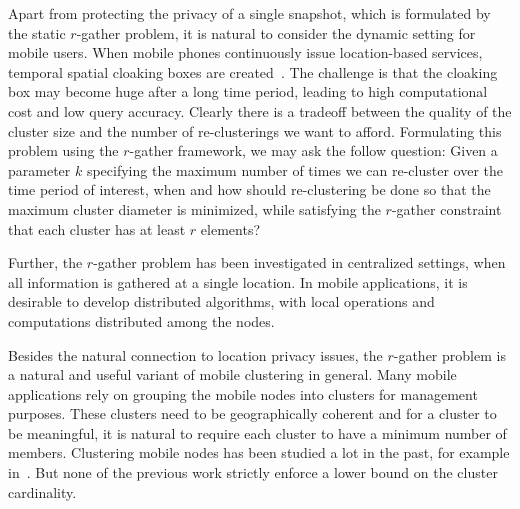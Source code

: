 Apart from protecting the privacy of a single snapshot, which is formulated by the static $r$-gather problem, it is natural to consider the dynamic setting for mobile users. 
When mobile phones continuously issue location-based services, temporal spatial cloaking boxes are created~\cite{Chow:2007:EPC:1784462.1784477,Xu:2007:LAC:1341012.1341062,4509698}. The challenge is that the cloaking box may become huge after a long time period, leading to high computational cost and low query accuracy. Clearly there is a tradeoff between the quality of the cluster size and the number of re-clusterings we want to afford. Formulating this problem using the $r$-gather framework, we may ask the follow question: Given a parameter $k$ specifying the maximum number of times we can re-cluster over the time period of interest, when and how should re-clustering be done so that the maximum cluster diameter is minimized, while satisfying the $r$-gather constraint that each cluster has at least $r$ elements?

Further, the $r$-gather problem has been investigated in centralized settings, when all information is gathered at a single location. In mobile applications, it is desirable to  develop distributed algorithms, with local operations and computations distributed among the nodes. 

Besides the natural connection to location privacy issues, the $r$-gather problem is a natural and useful variant of mobile clustering in general. Many mobile applications rely on grouping the mobile nodes into clusters for management purposes. These clusters need to be geographically coherent and for a cluster to be meaningful, it is natural to require each cluster to have a minimum number of members. Clustering mobile nodes has been studied a lot in the past, for example in~\cite{593002,lin97adaptive,chen99clustering,basu01mobility,Basagni99distributed,gghzz-dmc-03}. But none of the previous work strictly enforce a lower bound on the cluster cardinality. 

